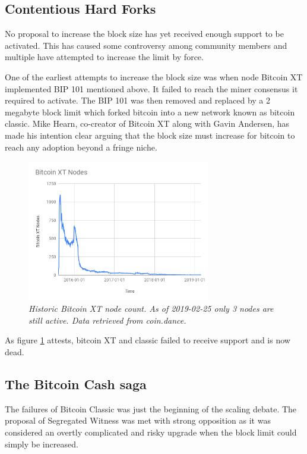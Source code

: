 \subsection{Contentious Hard Forks}

No proposal to increase the block size has yet received enough support to be activated. This has caused some controversy among community members and multiple have attempted to increase the limit by force. 

One of the earliest attempts to increase the block size was when node Bitcoin XT implemented BIP 101 mentioned above. It failed to reach the miner consensus it required to activate. The BIP 101 was then removed and replaced by a 2 megabyte block limit which forked bitcoin into a new network known as bitcoin classic. Mike Hearn, co-creator of Bitcoin XT along with Gavin Andersen, has made his intention clear arguing that the block size must increase for bitcoin to reach any adoption beyond a fringe niche\cite{hearn:classic}. 

\begin{figure}[!htb]
	\hspace*{-0.7cm} 
	\centering
	\includegraphics[width=8cm]{external/Bitcoin_XT_Nodes.png}
	\caption{\textit{Historic Bitcoin XT node count. As of 2019-02-25 only 3 nodes are still active. Data retrieved from coin.dance\cite{coin:dance}.}}
	\label{fig:xt_nodes}
	\hspace*{2mm} 	
\end{figure}

As figure \ref{fig:xt_nodes} attests, bitcoin XT and classic failed to receive support and is now dead.

\subsection{The Bitcoin Cash saga}

The failures of Bitcoin Classic was just the beginning of the scaling debate. The proposal of Segregated Witness\cite{bip:0141:segwit} was met with strong opposition as it was considered an overtly complicated and risky upgrade when the block limit could simply be increased. 

